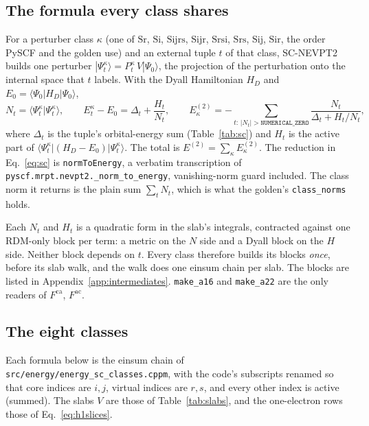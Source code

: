 \documentclass[11pt]{article}
\newcommand{\code}[1]{\texttt{#1}}
\newcommand{\Fca}{F^{\mathrm{ca}}}
\newcommand{\Fac}{F^{\mathrm{ac}}}
\newcommand{\cls}[1]{\ensuremath{\mathrm{#1}}}
\begin{document}
\subsection{The formula every class shares}
For a perturber class $\kappa$ (one of \cls{Sr}, \cls{Si}, \cls{Sijrs},
\cls{Sijr}, \cls{Srsi}, \cls{Srs}, \cls{Sij}, \cls{Sir}, the order PySCF and
the golden use) and an external tuple $t$ of that class, SC-NEVPT2 builds one
perturber $|\Psi^\kappa_t\rangle = P^\kappa_t\,V|\Psi_0\rangle$, the projection
of the perturbation onto the internal space that $t$ labels. With the Dyall
Hamiltonian $H_D$ and $E_0 = \langle\Psi_0|H_D|\Psi_0\rangle$,
\begin{equation}
  N_t = \langle\Psi^\kappa_t|\Psi^\kappa_t\rangle,\qquad
  E^\kappa_t - E_0 = \Delta_t + \frac{H_t}{N_t},\qquad
  E^{(2)}_\kappa = -\!\!\sum_{t:\,|N_t|>\code{NUMERICAL\_ZERO}}\!\!
     \frac{N_t}{\Delta_t + H_t/N_t},
  \label{eq:sc}
\end{equation}
where $\Delta_t$ is the tuple's orbital-energy sum (Table~\ref{tab:sc}) and
$H_t$ is the active part of $\langle\Psi^\kappa_t|(H_D - E_0)|\Psi^\kappa_t
\rangle$. The total is $E^{(2)} = \sum_\kappa E^{(2)}_\kappa$. The reduction in
Eq.~\eqref{eq:sc} is \code{normToEnergy}, a verbatim transcription of
\code{pyscf.mrpt.nevpt2.\_norm\_to\_energy}, vanishing-norm guard included.
The class norm it returns is the plain sum $\sum_t N_t$, which is what the
golden's \code{class\_norms} holds.

Each $N_t$ and $H_t$ is a quadratic form in the slab's integrals, contracted
against one RDM-only block per term: a metric on the $N$ side and a Dyall
block on the $H$ side. Neither block depends on $t$. Every class therefore
builds its blocks \emph{once}, before its slab walk, and the walk does one
einsum chain per slab. The blocks are listed in
Appendix~\ref{app:intermediates}. \code{make\_a16} and \code{make\_a22} are
the only readers of $\Fca$, $\Fac$.

\subsection{The eight classes}
\label{sec:sc-classes}
Each formula below is the einsum chain of
\code{src/energy/energy\_sc\_classes.cppm}, with the code's subscripts renamed
so that core indices are $i,j$, virtual indices are $r,s$, and every other
index is active (summed). The slabs $V$ are those of Table~\ref{tab:slabs},
and the one-electron rows those of Eq.~\eqref{eq:h1slices}.
\end{document}
